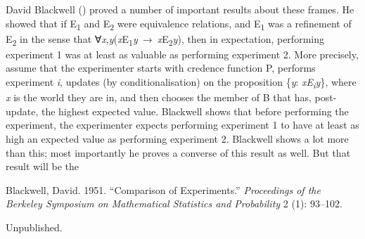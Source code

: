 \documentclass[
  10pt,
  letterpaper,
  DIV=11,
  numbers=noendperiod,
  twoside]{scrartcl}
\newlength{\cslhangindent}
\newenvironment{CSLReferences}[2] %
 {\begin{list}{}{%
  \setlength{\itemindent}{0pt}
  \setlength{\leftmargin}{0pt}
  \setlength{\parsep}{0pt}
  \ifodd #1
   \setlength{\leftmargin}{\cslhangindent}
   \setlength{\itemindent}{-1\cslhangindent}
  \fi
  \setlength{\itemsep}{#2\baselineskip}}}
 {\end{list}}
\begin{document}
David Blackwell ()
proved a number of important results about these frames. He showed that
if E\textsubscript{1} and E\textsubscript{2} were equivalence relations,
and E\textsubscript{1} was a refinement of E\textsubscript{2} in the
sense that
∀\emph{x},\emph{y}(\emph{x}E\textsubscript{1}\emph{y}~→~\emph{x}E\textsubscript{2}\emph{y}),
then in expectation, performing experiment 1 was at least as valuable as
performing experiment 2. More precisely, assume that the experimenter
starts with credence function P, performs experiment \emph{i}, updates
(by conditionalisation) on the proposition \{\emph{y}:
\emph{xE\textsubscript{i}y}\}, where \emph{x} is the world they are in,
and then chooses the member of B that has, post-update, the highest
expected value. Blackwell shows that before performing the experiment,
the experimenter expects performing experiment 1 to have at least as
high an expected value as performing experiment 2. Blackwell shows a lot
more than this; most importantly he proves a converse of this result as
well. But that result will be the

\label{refs}
\begin{CSLReferences}{1}{0}
Blackwell, David. 1951. {``Comparison of Experiments.''}
\emph{Proceedings of the Berkeley Symposium on Mathematical Statistics
and Probability} 2 (1): 93--102.

\end{CSLReferences}



\noindent Unpublished.
\end{document}
